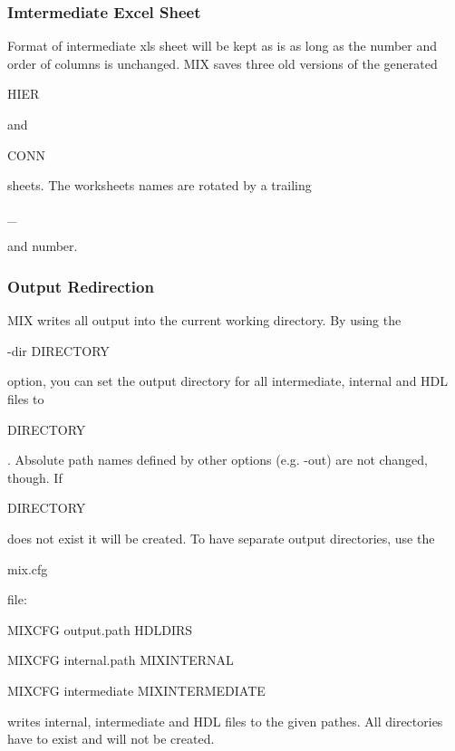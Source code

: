 \documentclass[a4paper,12pt]{article}
\begin{document}
\subsubsection{Imtermediate Excel Sheet}
Format of intermediate xls sheet will be kept as is as long as the number and order of columns is unchanged.\newline
MIX saves three old versions of the generated \begin{tt}HIER\end{tt} and \begin{tt}CONN\end{tt} sheets. The worksheets names are rotated by a trailing \begin{tt}\_\end{tt} and number.

\subsubsection{Output Redirection}
MIX writes all output into the current working directory. By using the\newline
\hspace*{20mm}\begin{tt}-dir DIRECTORY\end{tt}\newline
option, you can set the output directory for all intermediate, internal and HDL files to \begin{tt}DIRECTORY\end{tt}. Absolute path names defined by other options (e.g. -out) are not changed, though. If \begin{tt}DIRECTORY\end{tt} does not exist it will be created.
To have separate output directories, use the \begin{tt}mix.cfg\end{tt} file:\newline
\hspace*{20mm}\begin{tt}MIXCFG output.path HDLDIRS\end{tt}\newline
\hspace*{20mm}\begin{tt}MIXCFG internal.path MIXINTERNAL\end{tt}\newline
\hspace*{20mm}\begin{tt}MIXCFG intermediate MIXINTERMEDIATE\end{tt}\newline
writes internal, intermediate and HDL files to the given pathes. All directories have to exist and will not be created.
\end{document}
